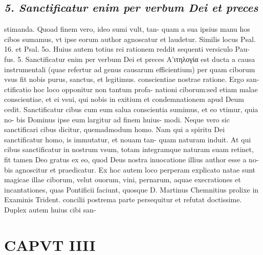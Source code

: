 \documentclass{article}
\begin{document}
\begin{pages}
\subsection*{\textit{5. Sanctificatur enim per verbum Dei et preces}}stimanda. Quoad finem vero, ideo sumi vult, tan- quam a sua ipsius manu hos cibos sumamus, vt ipse eorum author agnoscatur et laudetur. Similis locus Psal. 16. et Psal. 5o. Huius autem totius rei rationem reddit sequenti versiculo Pau- fus. 5. Sanctificatur enim per verbum Dei et preces Α’ιτηλογία est ducta a causa instrumentali (quae refertur ad genus causarum efficientium) per quam ciborum vsus fit nobis purus, sanctus, et legitimus. conscientiae nostrae ratione. Ergo san- ctificatio hoc loco opponitur non tantum profa- nationi ciborum:sed etiam malae conscientiae, et ei vsui, qui nobis in exitium et condemnationem apud Deum cedit. Sanctificatur cibus cum eum salua conscientia sumimus, et eo vtimur, quia no- bis Dominus ipse eum largitur ad finem huius- modi. Neque vero sic sanctificari cibus dicitur, quemadmodum homo. Nam qui a spiritu Dei sanctificatur homo, is immutatur, et nouam tan- quam naturam induit. At qui cibus sanctificatur in nostrum vsum, totam integramque naturam suam retinet, fit tamen Deo gratus ex eo, quod Deus nostra inuocatione illius author esse a no- bis agnoscitur et praedicatur. Ex hoc autem loco perperam explicato natae sunt magicae illae ciborum, velut ouorum, vini, pernarum, aquae execrationes et incantationes, quas Pontificii faciunt, quosque D. Martinus Chemnitius prolixe in Examinis Trident. concilii postrema parte persequitur et refutat doctissime. Duplex autem huius cibi san-  \pend
\section*{CAPVT  IIII }
\marginpar{[ p.19 ]}\pstart {}
{}

\end{pages}
\end{document}
